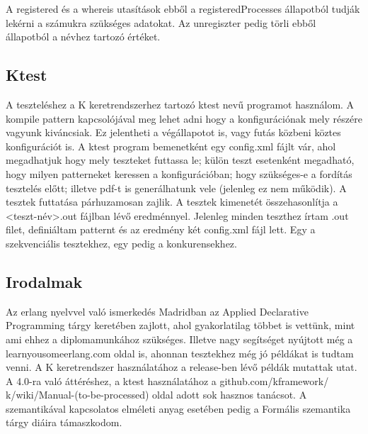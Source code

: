 \documentclass[]{article}
\begin{document}
A registered és a whereis utasítások ebből a registeredProcesses állapotból tudják lekérni a számukra szükséges adatokat. Az unregiszter pedig törli ebből állapotból a névhez tartozó értéket.






\subsection*{Ktest}
A teszteléshez a K keretrendszerhez tartozó ktest nevű programot használom. A kompile pattern kapcsolójával meg lehet adni hogy a konfigurációnak mely részére vagyunk kiváncsiak. Ez jelentheti a végállapotot is, vagy futás közbeni köztes konfigurációt is. A ktest program bemenetként egy config.xml fájlt vár, ahol megadhatjuk hogy mely teszteket futtassa le; külön teszt esetenként megadható, hogy milyen patterneket keressen a konfigurációban; hogy szükséges-e a fordítás tesztelés előtt; illetve pdf-t is generálhatunk vele (jelenleg ez nem működik). A tesztek futtatása párhuzamosan zajlik. A tesztek kimenetét összehasonlítja a <teszt-név>.out fájlban lévő eredménnyel. Jelenleg minden teszthez írtam .out filet, definiáltam patternt és az eredmény két config.xml fájl lett. Egy a szekvenciális tesztekhez, egy pedig a konkurensekhez.

\subsection*{Irodalmak}
Az erlang nyelvvel való ismerkedés Madridban az Applied Declarative Programming tárgy keretében zajlott, ahol gyakorlatilag többet is vettünk, mint ami ehhez a diplomamunkához szükséges. Illetve nagy segítséget nyújtott még a learnyousomeerlang.com oldal is, ahonnan tesztekhez még jó példákat is tudtam venni. A K keretrendszer használatához a release-ben lévő példák mutattak utat. A 4.0-ra való áttéréshez, a ktest használatához a github.com/kframework/ k/wiki/Manual-(to-be-processed) oldal adott sok hasznos tanácsot. A szemantikával kapcsolatos elméleti anyag esetében pedig a Formális szemantika tárgy diáira támaszkodom.
\end{document}
